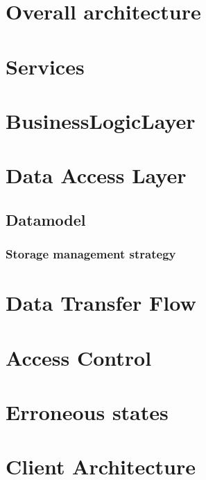 \documentclass{report}
\begin{document}
\section{Overall architecture}


\section{Services}


\section{BusinessLogicLayer}


\section{Data Access Layer}
\subsection{Datamodel}

\subsubsection{Storage management strategy}



\section{Data Transfer Flow}


% 

\section{Access Control}


\section{Erroneous states}




\section{Client Architecture}

\end{document}
